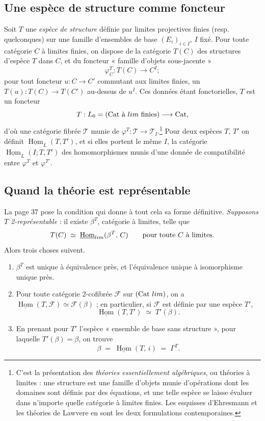 \documentclass[11pt,a4paper]{article}
\begin{document}
\subsection*{Une espèce de structure comme foncteur}

Soit $T$ une \emph{espèce de structure} définie par limites projectives finies
(resp. quelconques) sur une famille d'ensembles de base $(E_{i})_{i \in I}$,
$I$ fixé. Pour toute catégorie $C$ à limites finies, on dispose de la catégorie
$T(C)$ des structures d'espèce $T$ dans $C$, et du foncteur « famille d'objets
sous-jacente »
\[
\varphi^{T}_{C} : T(C) \longrightarrow C^{I} ;
\]
pour tout foncteur $u : C \to C'$ commutant aux limites finies, un
$T(u) : T(C) \to T(C')$ au-dessus de $u^{I}$. Ces données étant fonctorielles,
$T$ est un foncteur
\[
T : L_{0} = (\mathrm{Cat} \text{ à } \varprojlim \text{ finies})
\longrightarrow \mathrm{Cat},
\]
d'où une catégorie fibrée $\mathcal{T}$ munie de $\varphi^{T} : \mathcal{T} \to
\mathcal{T}_{I}$.\footnote{C'est la présentation des \emph{théories
essentiellement algébriques}, ou théories à limites : une structure est une
famille d'objets munie d'opérations dont les domaines sont définis par des
équations, et une telle espèce se laisse évaluer dans n'importe quelle
catégorie à limites finies. Les esquisses d'Ehresmann et les théories de
Lawvere en sont les deux formulations contemporaines.} Pour deux espèces $T$,
$T'$ on définit $\underline{\operatorname{Hom}}_{L}(T,T')$, et si elles portent
le même $I$, la catégorie $\underline{\operatorname{Hom}}_{L}(I;T,T')$ des
homomorphismes munis d'une donnée de compatibilité entre $\varphi^{T}$ et
$\varphi^{T'}$.

\subsection*{Quand la théorie est représentable}

La page 37 pose la condition qui donne à tout cela sa forme définitive.
\emph{Supposons $T$ 2-représentable} : il existe $\beta^{T}$, catégorie à
limites, telle que
\[
T(C) \;\simeq\; \underline{\operatorname{Hom}}_{\varprojlim}(\beta^{T},\, C)
\qquad \text{pour toute } C \text{ à limites.}
\]
Alors trois choses suivent.

\begin{enumerate}
\item[a)] $\beta^{T}$ est unique à équivalence près, et l'équivalence unique à
isomorphisme unique près.
\item[b)] Pour toute catégorie 2-cofibrée $\mathcal{F}$ sur
$(\mathrm{Cat}\ \varprojlim)$, on a
$\underline{\operatorname{Hom}}(T, \mathcal{F}) \simeq \mathcal{F}(\beta)$ ; en
particulier, si $\mathcal{F}$ est définie par une espèce $T'$,
\[
\underline{\operatorname{Hom}}(T, T') \;\simeq\; T'(\beta).
\]
\item[c)] En prenant pour $T'$ l'espèce « ensemble de base sans structure »,
pour laquelle $T'(\beta) = \beta$, on trouve
\[
\beta \;=\; \underline{\operatorname{Hom}}(T,\, i) \;=\; \Gamma^{T}.
\]
\end{enumerate}
\end{document}
